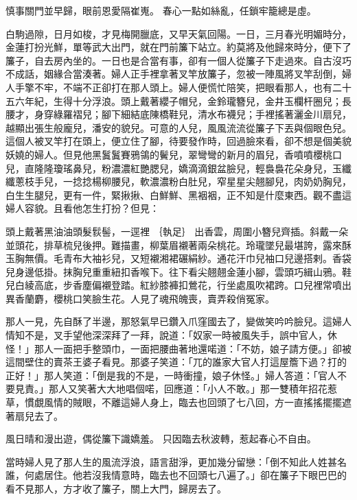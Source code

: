 慎事關門並早歸，眼前恩愛隔崔嵬。
春心一點如絲亂，任鎖牢籠總是虛。

白駒過隙，日月如梭，才見梅開臘底，又早天氣回陽。一日，三月春光明媚時分，金蓮打扮光鮮，單等武大出門，就在門前簾下站立。約莫將及他歸來時分，便下了簾子，自去房內坐的。一日也是合當有事，卻有一個人從簾子下走過來。自古沒巧不成話，姻緣合當湊著。婦人正手裡拿著叉竿放簾子，忽被一陣風將叉竿刮倒，婦人手擎不牢，不端不正卻打在那人頭上。婦人便慌忙陪笑，把眼看那人，也有二十五六年紀，生得十分浮浪。頭上戴著纓子帽兒，金鈴瓏簪兒，金井玉欄杆圈兒；長腰才，身穿綠羅褶兒；腳下細結底陳橋鞋兒，清水布襪兒；手裡搖著灑金川扇兒，越顯出張生般龐兒，潘安的貌兒。可意的人兒，風風流流從簾子下丟與個眼色兒。這個人被叉竿打在頭上，便立住了腳，待要發作時，回過臉來看，卻不想是個美貌妖嬈的婦人。但見他黑鬒鬒賽鴉鴒的鬢兒，翠彎彎的新月的眉兒，香噴噴櫻桃口兒，直隆隆瓊瑤鼻兒，粉濃濃紅艷腮兒，嬌滴滴銀盆臉兒，輕裊裊花朵身兒，玉纖纖蔥枝手兒，一捻捻楊柳腰兒，軟濃濃粉白肚兒，窄星星尖翹腳兒，肉奶奶胸兒，白生生腿兒，更有一件，緊揪揪、白鮮鮮、黑裀裀，正不知是什麼東西。觀不盡這婦人容貌。且看他怎生打扮？但見：

頭上戴著黑油油頭髮䯼髻，一逕裡
｛執足｝ %
出香雲，周圍小簪兒齊插。斜戴一朵並頭花，排草梳兒後押。難描畫，柳葉眉襯著兩朵桃花。玲瓏墜兒最堪誇，露來酥玉胸無價。毛青布大袖衫兒，又短襯湘裙碾絹紗。通花汗巾兒袖口兒邊搭剌。香袋兒身邊低掛。抹胸兒重重紐扣香喉下。往下看尖翹翹金蓮小腳，雲頭巧緝山鴉。鞋兒白綾高底，步香塵偏襯登踏。紅紗膝褲扣鶯花，行坐處風吹裙跨。口兒裡常噴出異香蘭麝，櫻桃口笑臉生花。人見了魂飛魄喪，賣弄殺俏冤家。

那人一見，先自酥了半邊，那怒氣早已鑽入爪窪國去了，變做笑吟吟臉兒。這婦人情知不是，叉手望他深深拜了一拜，說道：「奴家一時被風失手，誤中官人，休怪！」那人一面把手整頭巾，一面把腰曲著地還喏道：「不妨，娘子請方便。」卻被這間壁住的賣茶王婆子看見。那婆子笑道：「兀的誰家大官人打這屋簷下過？打的正好！」那人笑道：「倒是我的不是，一時衝撞，娘子休怪。」婦人答道：「官人不要見責。」那人又笑著大大地唱個喏，回應道：「小人不敢。」那一雙積年招花惹草，慣覷風情的賊眼，不離這婦人身上，臨去也回頭了七八回，方一直搖搖擺擺遮著扇兒去了。

風日晴和漫出遊，偶從簾下識嬌羞。
只因臨去秋波轉，惹起春心不自由。

當時婦人見了那人生的風流浮浪，語言甜淨，更加幾分留戀：「倒不知此人姓甚名誰，何處居住。他若沒我情意時，臨去也不回頭七八遍了。」卻在簾子下眼巴巴的看不見那人，方才收了簾子，關上大門，歸房去了。

